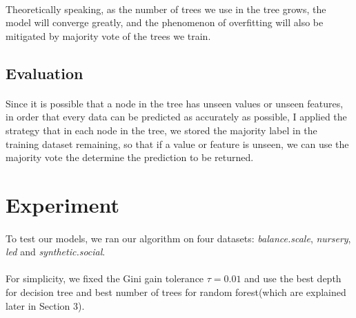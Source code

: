 \documentclass[11pt]{article}
\begin{document}
    \paragraph{}
    	Theoretically speaking, as the number of trees we use in the tree grows, the model will converge greatly, and the phenomenon of overfitting will also be mitigated by majority vote of the trees we train.
    	
    \subsection{Evaluation}
    \paragraph{}
    	Since it is possible that a node in the tree has unseen values or unseen features, in order that every data can be predicted as accurately as possible, I applied the strategy that in each node in the tree, we stored the majority label in the training dataset remaining, so that if a value or feature is unseen, we can use the majority vote the determine the prediction to be returned.
    	
    \section{Experiment}
    \paragraph{}
    To test our models, we ran our algorithm on four datasets: \textit{balance.scale}, \textit{nursery}, \textit{led} and \textit{synthetic.social}.
    
    \paragraph{}
    For simplicity, we fixed the Gini gain tolerance $\tau = 0.01$ and use the best depth for decision tree and best number of trees for random forest(which are explained later in Section 3).
    
\end{document}
